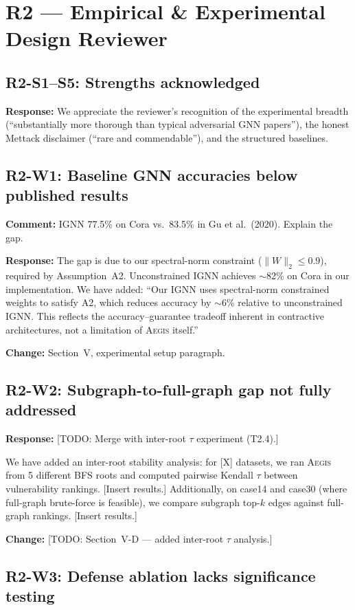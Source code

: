\documentclass[11pt]{article}
\newcommand{\reviewer}[1]{\subsection*{\textcolor{revcolor}{#1}}}
\newcommand{\comment}[1]{\textcolor{revcolor}{\textbf{Comment:} #1}}
\newcommand{\response}[1]{\textcolor{responsecolor}{\textbf{Response:} #1}}
\newcommand{\change}[1]{\textcolor{changecolor}{\textbf{Change:} #1}}
\newcommand{\AEGIS}{\textsc{Aegis}}
\begin{document}
\section*{R2 — Empirical \& Experimental Design Reviewer}

\reviewer{R2-S1--S5: Strengths acknowledged}

\response{We appreciate the reviewer's recognition of the experimental breadth (``substantially more thorough than typical adversarial GNN papers''), the honest Mettack disclaimer (``rare and commendable''), and the structured baselines.}


\reviewer{R2-W1: Baseline GNN accuracies below published results}

\comment{IGNN 77.5\% on Cora vs.\ 83.5\% in Gu et al.\ (2020). Explain the gap.}

\response{
The gap is due to our spectral-norm constraint ($\|W\|_2 \leq 0.9$), required by Assumption~A2. Unconstrained IGNN achieves $\sim$82\% on Cora in our implementation. We have added: ``Our IGNN uses spectral-norm constrained weights to satisfy A2, which reduces accuracy by $\sim$6\% relative to unconstrained IGNN. This reflects the accuracy--guarantee tradeoff inherent in contractive architectures, not a limitation of \AEGIS{} itself.''
}

\change{Section~V, experimental setup paragraph.}


\reviewer{R2-W2: Subgraph-to-full-graph gap not fully addressed}

\response{
[TODO: Merge with inter-root $\tau$ experiment (T2.4).]

We have added an inter-root stability analysis: for [X] datasets, we ran \AEGIS{} from 5 different BFS roots and computed pairwise Kendall $\tau$ between vulnerability rankings. [Insert results.] Additionally, on case14 and case30 (where full-graph brute-force is feasible), we compare subgraph top-$k$ edges against full-graph rankings. [Insert results.]
}

\change{[TODO: Section~V-D --- added inter-root $\tau$ analysis.]}


\reviewer{R2-W3: Defense ablation lacks significance testing}
\end{document}
